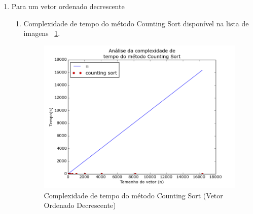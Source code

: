 \documentclass[12pt,a4paper,twoside]{report}
\begin{document}
\begin{enumerate}
\begin{enumerate}
		\end{enumerate}



		\item Para um vetor ordenado decrescente
				\begin{enumerate}

					\item Complexidade de tempo do método Counting Sort disponível na lista de imagens ~\ref{fig:CountingPlot2OD}.
					\begin{figure}[!h]
						\centering
						\includegraphics[scale=0.6]{../imagens/Counting/counting_plot_2_ordenado_decrescente.png}
						\caption{Complexidade de tempo do método Counting Sort (Vetor Ordenado Decrescente) \label{fig:CountingPlot2OD}}
					\end{figure}



\end{enumerate}
\end{enumerate}
\end{document}
